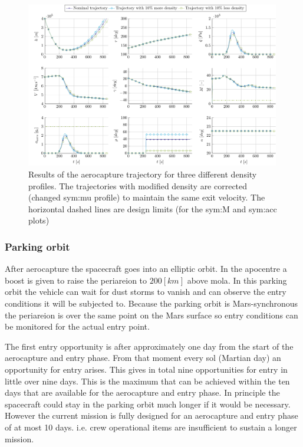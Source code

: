 \begin{figure}
	\centering
	\includegraphics[width=0.99\textwidth]{Figure/Orbit/sensitivity_aerocapture.pdf}
	\caption[Results of the aerocapture trajectory for three different density profiles]{Results of the aerocapture trajectory for three different density profiles. The trajectories with modified density are corrected (changed \gls{sym:mu} profile) to maintain the same exit velocity. The horizontal dashed lines are design limits (for the \gls{sym:M} and \gls{sym:acc} plots) }
	\label{fig:orbit_aerocapture_data}
\end{figure}

\subsubsection{Parking orbit}\label{sec:parking_orbit}
After aerocapture the spacecraft goes into an elliptic orbit. In the apocentre a boost is given to raise the periareion to $200 \left[km\right]$ above \gls{mola}. In this parking orbit the vehicle can wait for dust storms to vanish and can observe the entry conditions it will be subjected to. Because the parking orbit is Mars-synchronous the periareion is over the same point on the Mars surface so entry conditions can be monitored for the actual entry point.

The first entry opportunity is after approximately one day from the start of the aerocapture and entry phase. From that moment every sol (Martian day) an opportunity for entry arises. This gives in total nine opportunities for entry in little over nine days. This is the maximum that can be achieved within the ten days that are available for the aerocapture and entry phase. In principle the spacecraft could stay in the parking orbit much longer if it would be necessary. However the current mission is fully designed for an aerocapture and entry phase of at most 10 days. i.e. crew operational items are insufficient to sustain a longer mission.

